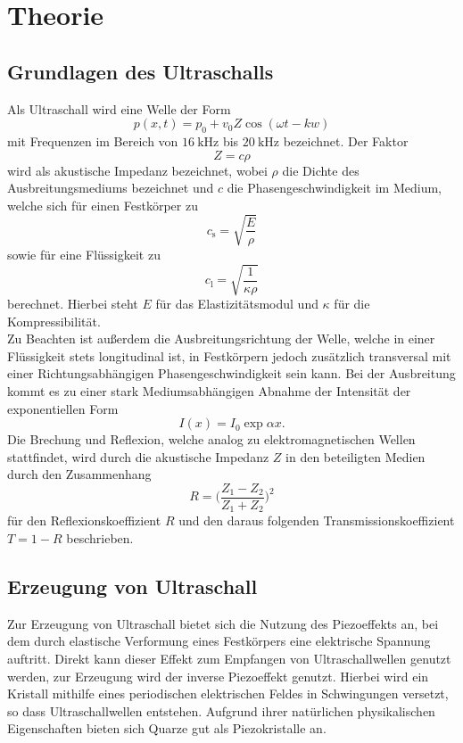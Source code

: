 \section{Theorie}
\label{sec:Theorie}

\subsection{Grundlagen des Ultraschalls}

Als Ultraschall wird eine Welle der Form
\begin{equation}
  p(x,t) = p_0 + v_0 Z \cos{(\omega t - k w)}
\end{equation}
mit Frequenzen im Bereich von $\SI{16}{\kilo\hertz}$ bis $\SI{20}{\kilo\hertz}$ bezeichnet.
Der Faktor
\begin{equation}
  Z = c \rho
\end{equation}
wird als akustische Impedanz bezeichnet, wobei $\rho$ die Dichte des Ausbreitungsmediums bezeichnet und $c$ die Phasengeschwindigkeit im Medium, welche sich für einen Festkörper zu
\begin{equation}
  c_\text{s} = \sqrt{\frac{E}{\rho}}
\end{equation}
sowie für eine Flüssigkeit zu
\begin{equation}
  c_\text{l} = \sqrt{\frac{1}{\kappa \rho}}
\end{equation}
berechnet.
Hierbei steht $E$ für das Elastizitätsmodul und $\kappa$ für die Kompressibilität.\\
Zu Beachten ist außerdem die Ausbreitungsrichtung der Welle, welche in einer Flüssigkeit stets longitudinal ist, in Festkörpern jedoch zusätzlich transversal mit einer Richtungsabhängigen Phasengeschwindigkeit sein kann.
Bei der Ausbreitung kommt es zu einer stark Mediumsabhängigen Abnahme der Intensität der exponentiellen Form
\begin{equation}
  I(x) = I_0 \exp{\alpha x}.
\end{equation}
Die Brechung und Reflexion, welche analog zu elektromagnetischen Wellen stattfindet, wird durch die akustische Impedanz $Z$ in den beteiligten Medien durch den Zusammenhang
\begin{equation}
  R = \bigl( \frac{Z_1 - Z_2}{Z_1 + Z_2} \bigr)^2
\end{equation}
für den Reflexionskoeffizient $R$ und den daraus folgenden Transmissionskoeffizient $T = 1-R$ beschrieben.

\subsection{Erzeugung von Ultraschall}
Zur Erzeugung von Ultraschall bietet sich die Nutzung des Piezoeffekts an, bei dem durch elastische Verformung eines Festkörpers eine elektrische Spannung auftritt.
Direkt kann dieser Effekt zum Empfangen von Ultraschallwellen genutzt werden, zur Erzeugung wird der inverse Piezoeffekt genutzt.
Hierbei wird ein Kristall mithilfe eines periodischen elektrischen Feldes in Schwingungen versetzt, so dass Ultraschallwellen entstehen.
Aufgrund ihrer natürlichen physikalischen Eigenschaften bieten sich Quarze gut als Piezokristalle an.

